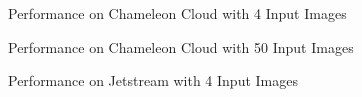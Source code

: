 \documentclass[9pt,twocolumn,twoside]{../../styles/osajnl}
\begin{document}
\begin{figure}[htbp]
\centering
{}
\caption{Performance on Chameleon Cloud with 4 Input Images}
\label{fig:cmedium4}
\end{figure}

\begin{figure}[htbp]
\centering
{}
\caption{Performance on Chameleon Cloud with 50 Input Images}
\label{fig:cmedium50}
\end{figure}

\begin{figure}[htbp]
\centering
{}
\caption{Performance on Jetstream with 4 Input Images}
\label{fig:jmedium4}
\end{figure}
\end{document}
